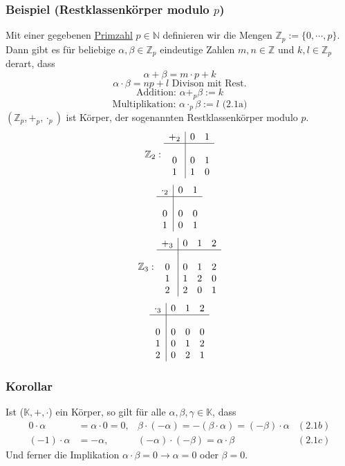\subsubsection{Beispiel (Restklassenkörper modulo $p$)}
Mit einer gegebenen \underline{Primzahl} $p\in\mathbb{N}$ definieren wir die Mengen $\mathbb{Z}_p := \{0,\cdots ,p\}$.  Dann gibt es für beliebige $\alpha ,\beta \in \mathbb{Z}_p$ eindeutige Zahlen $m,n\in\mathbb{Z}$ und $k,l\in\mathbb{Z}_p$ derart, dass 
\[\alpha + \beta = m\cdot p+k\]
\[\alpha\cdot\beta = np+l \text{ Divison mit Rest.}\]
\[\text{Addition: }\alpha+_p \beta := k\]
\[\text{Multiplikation: }\alpha \cdot_p \beta := l\text{ (2.1a)}\]
$(\mathbb{Z}_p,+_p,\cdot_p)$ ist Körper, der sogenannten Restklassenkörper modulo $p$.
\[\mathbb{Z}_2: \begin{array}{c|cc}+_2 & 0 & 1\\ \hline\\ 0 & 0 & 1 \\ 1 & 1 & 0\end{array} \]
\[\begin{array}{c|cc}\cdot_2 & 0 & 1\\ \hline \\ 0 & 0 & 0 \\ 1 & 0 & 1\end{array} \]
\[\mathbb{Z}_3: \begin{array}{c|ccc}+_3 & 0 & 1 & 2\\ \hline \\ 0 & 0 & 1 & 2\\ 1 & 1 & 2 & 0\\2 & 2 & 0 & 1\end{array} \]
\[\begin{array}{c|ccc}\cdot_3 & 0 & 1 & 2\\ \hline \\ 0 & 0 & 0 & 0\\ 1 & 0 & 1 & 2\\2 & 0 & 2 & 1\end{array} \]
\subsubsection{Korollar}
Ist ($\mathbb{K},+,\cdot $) ein Körper, so gilt für alle $\alpha ,\beta ,\gamma \in \mathbb{K}$, dass
\begin{align*}
0\cdot \alpha &= \alpha \cdot 0 = 0, & \beta\cdot (-\alpha ) = -(\beta \cdot \alpha ) = (-\beta )\cdot \alpha &(2.1b)\\
(-1)\cdot \alpha &= -\alpha , & (-\alpha )\cdot (-\beta ) = \alpha\cdot\beta &(2.1c)
\end{align*}
Und ferner die Implikation $\alpha\cdot\beta = 0 \rightarrow \alpha = 0$ oder $\beta = 0$.
